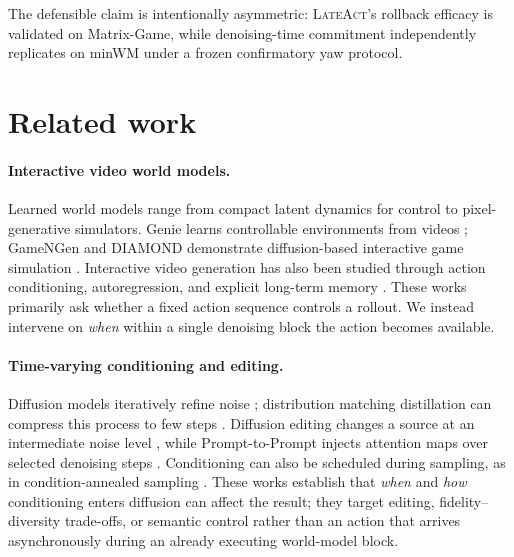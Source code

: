 \documentclass{article}
\newcommand{\method}{\textsc{LateAct}}
\begin{document}
The defensible claim is intentionally asymmetric: \method{}'s rollback
efficacy is validated on Matrix-Game, while denoising-time commitment
independently replicates on minWM under a frozen confirmatory yaw protocol.

\section{Related work}

\paragraph{Interactive video world models.}
Learned world models range from compact latent dynamics for control
\citep{ha2018worldmodels,hafner2023dreamerv3} to pixel-generative simulators.
Genie learns controllable environments from videos
\citep{bruce2024genie}; GameNGen and DIAMOND demonstrate diffusion-based
interactive game simulation \citep{valevski2025gamengen,alonso2024diamond}.
Interactive video generation has also been studied through action
conditioning, autoregression, and explicit long-term memory
\citep{chen2025interactive}. These works primarily ask whether a fixed action
sequence controls a rollout. We instead intervene on \emph{when} within a
single denoising block the action becomes available.

\paragraph{Time-varying conditioning and editing.}
Diffusion models iteratively refine noise \citep{ho2020ddpm}; distribution
matching distillation can compress this process to few steps
\citep{yin2024dmd}. Diffusion editing changes a source at an intermediate
noise level \citep{meng2022sdedit}, while Prompt-to-Prompt injects attention
maps over selected denoising steps \citep{hertz2023prompt}. Conditioning can
also be scheduled during sampling, as in condition-annealed sampling
\citep{sadat2024cads}. These works establish that \emph{when} and \emph{how}
conditioning enters diffusion can affect the result; they target editing,
fidelity--diversity trade-offs, or semantic control rather than an action that
arrives asynchronously during an already executing world-model block.
\end{document}
